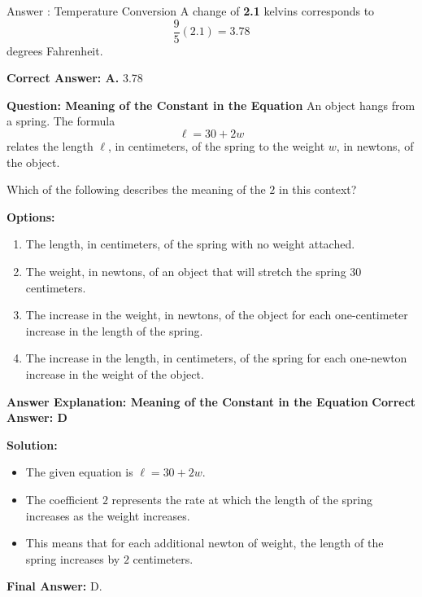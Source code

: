 \documentclass{beamer}
\begin{document}
\begin{frame}{Answer : Temperature Conversion}
    A change of \textbf{2.1} kelvins corresponds to
    \[
    \frac{9}{5}(2.1) = 3.78
    \]
    degrees Fahrenheit.

    \textbf{Correct Answer: A.} 3.78
\end{frame}

\begin{frame}{\textbf{Question: Meaning of the Constant in the Equation}}
    An object hangs from a spring. The formula
    \[
    \ell = 30 + 2w
    \]
    relates the length \( \ell \), in centimeters, of the spring to the weight \( w \), in newtons, of the object.

    Which of the following describes the meaning of the \( 2 \) in this context?

    \vspace{0.5cm}
    \textbf{Options:}
    \begin{enumerate}
        \item[A.] The length, in centimeters, of the spring with no weight attached.
        \item[B.] The weight, in newtons, of an object that will stretch the spring 30 centimeters.
        \item[C.] The increase in the weight, in newtons, of the object for each one-centimeter increase in the length of the spring.
        \item[D.] The increase in the length, in centimeters, of the spring for each one-newton increase in the weight of the object.
    \end{enumerate}
\end{frame}

\begin{frame}{\textbf{Answer Explanation: Meaning of the Constant in the Equation}}
    \textbf{Correct Answer: \textcolor{novelPurple}{\( \mathbf{D} \)}}  

    \vspace{0.3cm}
    \textbf{Solution:}
    \begin{itemize}
        \item The given equation is \( \ell = 30 + 2w \).
        \item The coefficient \( 2 \) represents the rate at which the length of the spring increases as the weight increases.
        \item This means that for each additional newton of weight, the length of the spring increases by \( 2 \) centimeters.
    \end{itemize}

    \textbf{Final Answer:} \( \boxed{\text{D}} \).
\end{frame}
\end{document}

